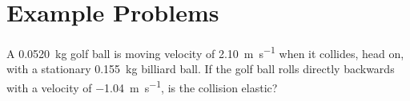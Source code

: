 \section{Example Problems}

\begin{example}
  A \SI{.0520}{\kilo\gram} golf ball is moving velocity of
  \SI{2.10}{\metre\per\second} when it collides, head on, with a stationary
  \SI{.155}{\kilo\gram} billiard  ball. If the golf ball rolls directly
  backwards with a velocity of \SI{-1.04}{\metre\per\second}, is the collision
  elastic?
\end{example}
%
%
%
%
%
%
%
%
%
%
%
%
